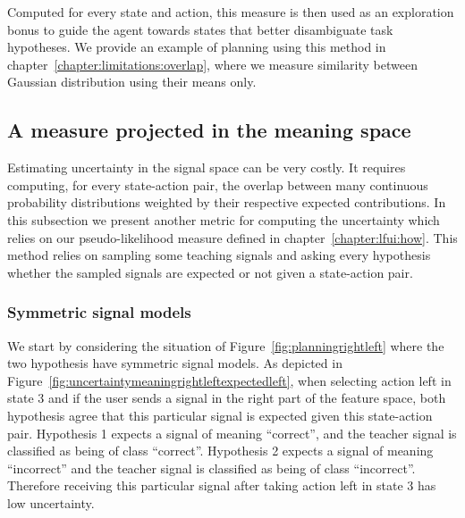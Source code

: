 
Computed for every state and action, this measure is then used as an exploration bonus to guide the agent towards states that better disambiguate task hypotheses. We provide an example of planning using this method in chapter~\ref{chapter:limitations:overlap}, where we measure similarity between Gaussian distribution using their means only.

\subsection{A measure projected in the meaning space}
\label{chapter:planning:uncertiantyprojected}

Estimating uncertainty in the signal space can be very costly. It requires computing, for every state-action pair, the overlap between many continuous probability distributions weighted by their respective expected contributions. In this subsection we present another metric for computing the uncertainty which relies on our pseudo-likelihood measure defined in chapter~\ref{chapter:lfui:how}. This method relies on sampling some teaching signals and asking every hypothesis whether the sampled signals are expected or not given a state-action pair.

\subsubsection*{Symmetric signal models}

We start by considering the situation of Figure~\ref{fig:planningrightleft} where the two hypothesis have symmetric signal models. As depicted in Figure~\ref{fig:uncertaintymeaningrightleftexpectedleft}, when selecting action left in state 3 and if the user sends a signal in the right part of the feature space, both hypothesis agree that this particular signal is expected given this state-action pair. Hypothesis 1 expects a signal of meaning ``correct'', and the teacher signal is classified as being of class ``correct''. Hypothesis 2 expects a signal of meaning ``incorrect'' and the teacher signal is classified as being of class ``incorrect''. Therefore receiving this particular signal after taking action left in state 3 has low uncertainty.

